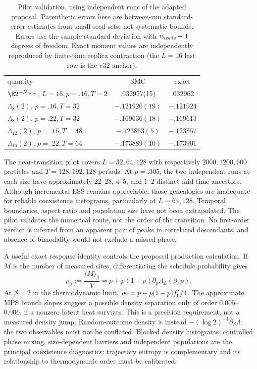 \begin{table}[t]
\caption{Pilot validation, using independent runs of the adapted proposal. Parenthetic errors here are between-run standard-error estimates from small seed sets, not systematic bounds. Errors use the sample standard deviation with $n_{\rm seeds}-1$ degrees of freedom. Exact moment values are independently reproduced by finite-time replica contraction (the $L=16$ last row is the v32 anchor).}
\label{tab:smc-validation}
\begin{ruledtabular}
\begin{tabular}{lcc}
quantity & SMC & exact\\
\colrule
$\E 2^{-N_{\rm rand}}$, $L=16,p=.16,T=2$ & .032957(15) & .032962\\
$\Lambda_8(2)$, $p=.16,T=32$ & $-.121920(19)$ & $-.121924$\\
$\Lambda_8(2)$, $p=.22,T=32$ & $-.169636(18)$ & $-.169613$\\
$\Lambda_{12}(2)$, $p=.16,T=48$ & $-.123863(5)$ & $-.123857$\\
$\Lambda_{16}(2)$, $p=.22,T=64$ & $-.173889(10)$ & $-.173901$\\
\end{tabular}
\end{ruledtabular}
\end{table}

The near-transition pilot covers $L=32,64,128$ with respectively $2000,1200,600$ particles and $T=128,192,128$ periods. At $p=.305$, the two independent runs at each size have approximately $22$--$28$, $4$--$5$, and $1$--$2$ distinct mid-time ancestors. Although incremental ESS remains appreciable, those genealogies are inadequate for reliable coexistence histograms, particularly at $L=64,128$. Temporal boundaries, aspect ratio and population size have not been extrapolated. The pilot validates the numerical route, not the order of the transition. No first-order verdict is inferred from an apparent pair of peaks in correlated descendants, and absence of bimodality would not exclude a missed phase.

A useful exact response identity controls the proposed production calculation. If $M$ is the number of measured sites, differentiating the schedule probability gives
\begin{equation}
 \rho_\beta:=\frac{\langle M\rangle_\beta}{V}
 =p+p(1-p)\partial_p\Lambda_L(\beta;p).
 \label{eq:tilted-density}
\end{equation}
At $\beta=2$ in the thermodynamic limit, $\rho_2=p-p(1-p)f_{\rm b}'/4$. The approximate MPS branch slopes suggest a possible density separation only of order $0.005$--$0.006$, if a nonzero latent heat survives. This is a precision requirement, not a measured density jump. Random-outcome density is instead $-(\log2)^{-1}\partial_\beta\Lambda$; the two observables must not be conflated. Blocked density histograms, controlled phase mixing, size-dependent barriers and independent populations are the principal coexistence diagnostics; trajectory entropy is complementary and its relationship to thermodynamic order must be calibrated.

